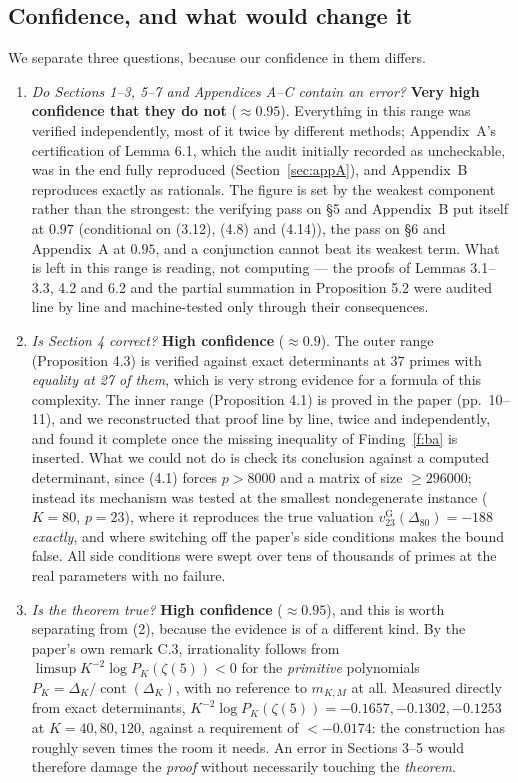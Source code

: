 \documentclass[11pt]{article}
\theoremstyle{definition}
\newcommand{\z}{\zeta(5)}
\begin{document}
\subsection*{Confidence, and what would change it}

We separate three questions, because our confidence in them differs.

\begin{enumerate}
\item \emph{Do Sections 1--3, 5--7 and Appendices A--C contain an error?}
\textbf{Very high confidence that they do not} ($\approx0.95$). Everything in
this range was verified independently, most of it twice by different methods; Appendix~A's
certification of Lemma 6.1, which the audit initially recorded as uncheckable, was in the end
fully reproduced (Section~\ref{sec:appA}), and Appendix~B reproduces exactly as rationals.
The figure is set by the weakest component rather than the strongest: the verifying pass on
\S5 and Appendix~B put itself at $0.97$ (conditional on (3.12), (4.8) and (4.14)), the pass on
\S6 and Appendix~A at $0.95$, and a conjunction cannot beat its weakest term. What is left in
this range is reading, not computing --- the proofs of Lemmas 3.1--3.3, 4.2 and 6.2 and the
partial summation in Proposition 5.2 were audited line by line and machine-tested only through
their consequences.

\item \emph{Is Section 4 correct?} \textbf{High confidence} ($\approx0.9$). The outer range
(Proposition 4.3) is verified against exact determinants at $37$ primes with \emph{equality at
27 of them}, which is very strong evidence for a formula of this complexity. The inner range
(Proposition 4.1) is proved in the paper (pp.~10--11), and we reconstructed that proof line by
line, twice and independently, and found it complete once the missing inequality of
Finding~\ref{f:ba} is inserted. What we could not do is check its conclusion against a computed
determinant, since (4.1) forces $p>8000$ and a matrix of size $\ge296000$; instead its mechanism
was tested at the smallest nondegenerate instance ($K=80$, $p=23$), where it reproduces the true valuation $v_{23}^{\mathrm{G}}(\Delta_{80})=-188$
\emph{exactly}, and where switching off the paper's side conditions makes the bound false. All
side conditions were swept over tens of thousands of primes at the real parameters with no
failure.

\item \emph{Is the theorem true?} \textbf{High confidence} ($\approx0.95$), and this is
worth separating from (2), because the evidence is of a different kind. By the paper's own
remark C.3, irrationality follows from
$\limsup K^{-2}\log P_K(\z)<0$ for the \emph{primitive} polynomials
$P_K=\Delta_K/\operatorname{cont}(\Delta_K)$, with no reference to $m_{K,M}$ at all. Measured
directly from exact determinants, $K^{-2}\log P_K(\z)=-0.1657,-0.1302,-0.1253$ at $K=40,80,120$,
against a requirement of $<-0.0174$: the construction has roughly seven times the room it needs.
An error in Sections 3--5 would therefore damage the \emph{proof} without necessarily touching
the \emph{theorem}.
\end{enumerate}
\end{document}
